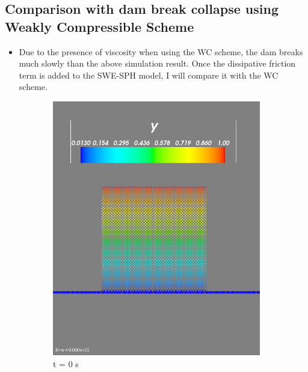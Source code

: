 \documentclass{article}
\begin{document}
\subsection{Comparison with dam break collapse using Weakly Compressible Scheme}
\begin{itemize}
\item Due to the presence of viscosity when using the WC scheme, the dam breaks
much slowly than the above simulation result. Once the dissipative friction
term is added to the SWE-SPH model, I will compare it with the WC scheme.
\end{itemize}
\begin{figure}[!htbp]
\centering
\begin{subfigure}{.5\textwidth}
  \centering
  \includegraphics[width=0.8\linewidth]{wc_t0.png}
  \caption{t = 0 s}
  \label{fig:su1}
\end{subfigure}%
\begin{subfigure}{.5\textwidth}
  \centering

\end{subfigure}
\end{figure}
\end{document}
